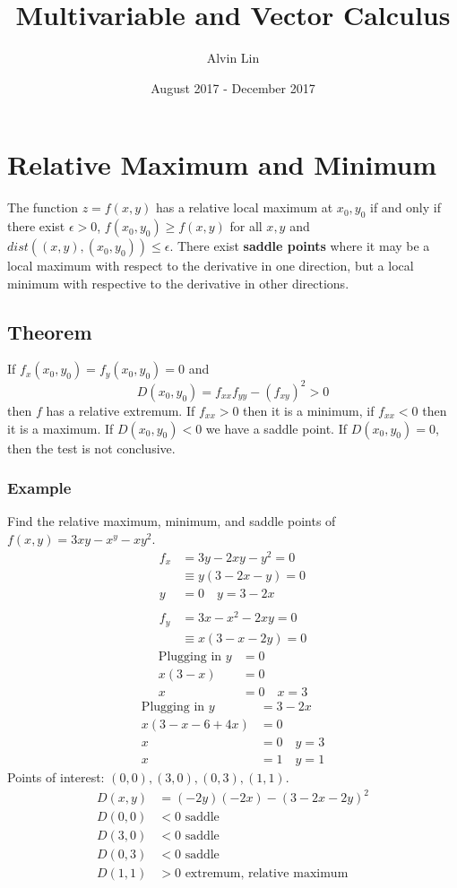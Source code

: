 \documentclass{math}
\title{Multivariable and Vector Calculus}
\author{Alvin Lin}
\date{August 2017 - December 2017}
\begin{document}
\maketitle

\section*{Relative Maximum and Minimum}
The function \( z = f(x,y) \) has a relative local maximum at \( x_0, y_0 \)
if and only if there exist \( \epsilon > 0 \), \( f(x_0,y_0)\ge f(x,y) \) for
all \( x,y \) and \( dist((x,y), (x_0,y_0))\le\epsilon \). There exist
\textbf{saddle points} where it may be a local maximum with respect to the
derivative in one direction, but a local minimum with respective to the
derivative in other directions.

\subsection*{Theorem}
If \( f_x(x_0,y_0) = f_y(x_0,y_0) = 0 \) and
\[ D(x_0,y_0) = f_{xx}f_{yy}-(f_{xy})^2 > 0 \]
then \( f \) has a relative extremum. If \( f_{xx} > 0 \) then it is a
minimum, if \( f_{xx} < 0 \) then it is a maximum. If \( D(x_0,y_0) < 0 \)
we have a saddle point. If \( D(x_0,y_0) = 0 \), then the test is not
conclusive.

\subsubsection*{Example}
Find the relative maximum, minimum, and saddle points of \( f(x,y) =
3xy-x^y-xy^2 \).
\begin{align*}
  f_x &= 3y-2xy-y^2 = 0 \\
  &\equiv y(3-2x-y) = 0 \\
  y &= 0 \quad y = 3-2x \\ \\
  f_y &= 3x-x^2-2xy = 0 \\
  &\equiv x(3-x-2y) = 0
\end{align*}
\begin{align*}
  \text{Plugging in } y &= 0 \\
  x(3-x) &= 0 \\
  x &= 0 \quad x = 3
\end{align*}
\begin{align*}
  \text{Plugging in } y &= 3-2x \\
  x(3-x-6+4x) &= 0 \\
  x &= 0 \quad y = 3 \\
  x &= 1 \quad y = 1
\end{align*}
Points of interest: \( (0,0), (3,0), (0,3), (1,1) \).
\begin{align*}
  D(x,y) &= (-2y)(-2x)-(3-2x-2y)^2 \\
  D(0,0) &< 0 \text{ saddle} \\
  D(3,0) &< 0 \text{ saddle} \\
  D(0,3) &< 0 \text{ saddle} \\
  D(1,1) &> 0 \text{ extremum, relative maximum}
\end{align*}
\end{document}
